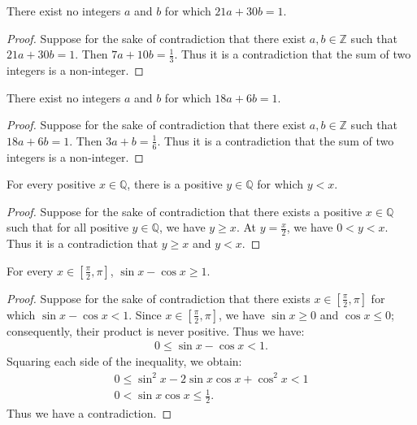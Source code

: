 \documentclass{exam}
\begin{document}
\begin{proposition}{6.10}
    There exist no integers $a$ and $b$ for which $21a + 30b = 1$.
\end{proposition}

\begin{proof}
    Suppose for the sake of contradiction that there exist $a,b\in\mathbb Z$ such that $21a + 30b = 1$. Then $7a + 10b = \frac13$. Thus it is a contradiction that the sum of two integers is a non-integer.
\end{proof}

\begin{proposition}{6.11}
    There exist no integers $a$ and $b$ for which $18a+6b=1$.
\end{proposition}

\begin{proof}
    Suppose for the sake of contradiction that there exist $a, b\in\mathbb Z$ such that $18a + 6b = 1$. Then $3a + b = \frac16$. Thus it is a contradiction that the sum of two integers is a non-integer.
\end{proof}

\begin{proposition}{6.12}
    For every positive $x\in\mathbb Q$, there is a positive $y\in\mathbb Q$ for which $y<x$.
\end{proposition}

\begin{proof}
    Suppose for the sake of contradiction that there exists a positive $x \in\mathbb Q$ such that for all positive $y\in\mathbb Q$, we have $y\ge x$. At $y = \frac{x}{2}$, we have $0 < y < x$. Thus it is a contradiction that $y \ge x$ and $y < x$.
\end{proof}

\begin{proposition}{6.13}
    For every $x\in\left[\frac\pi2,\pi\right]$, $\sin x-\cos x\ge 1$.
\end{proposition}

\begin{proof}
    Suppose for the sake of contradiction that there exists $x\in\left[\frac\pi2,\pi\right]$ for which $\sin x-\cos x<1$. Since $x\in\left[\frac\pi2,\pi\right]$, we have $\sin x \ge 0$ and $\cos x\le 0$; consequently, their product is never positive. Thus we have:
    \begin{align*}
        0\le\sin x-\cos x<1.
    \end{align*}
    Squaring each side of the inequality, we obtain:
    \begin{align*}
        0\le\sin^2x-2\sin x\cos x+\cos^2x<1\\
        0<\sin x\cos x\le\frac12.
    \end{align*}
    Thus we have a contradiction.
\end{proof}
\end{document}
